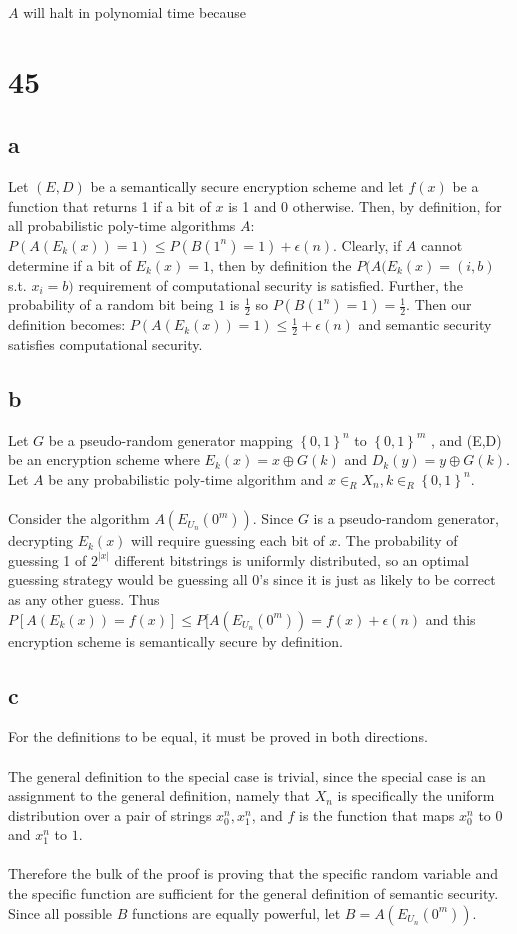 \documentclass[letterpaper,notitlepage,twoside]{article}
\begin{document}
$A$ will halt in polynomial time because \\

\section*{45}
\subsection*{a}
Let $(E, D)$ be a semantically secure encryption scheme and let $f(x)$ be a function that returns 1 if a bit of $x$ is 1 and 0 otherwise.
Then, by definition, for all probabilistic poly-time algorithms $A$: $P(A(E_k(x)) = 1) \leq P(B(1^{n}) = 1) + \epsilon(n)$.
Clearly, if $A$ cannot determine if a bit of $E_k(x) = 1$, then by definition the $P(A(E_k(x) = (i,b)$ s.t. $x_i = b)$ requirement of computational security is satisfied. 
Further, the probability of a random bit being $1$ is $\frac{1}{2}$ so $P(B(1^{n}) = 1) = \frac{1}{2}$. 
Then our definition becomes: $P(A(E_k(x)) = 1) \leq \frac{1}{2} + \epsilon(n)$ and semantic security satisfies computational security.

\subsection*{b}
Let $G$ be a pseudo-random generator mapping $\left\{0, 1\right\}^n$ to $\left\{0, 1\right\}^m$ , and (E,D) be an encryption scheme where $E_k(x) = x \oplus G(k)$ and $D_k(y) = y \oplus G(k)$. Let $A$ be any probabilistic poly-time algorithm and $x \in_R X_n,k \in_R \left\{0,1\right\}^n$.
\\\\
Consider the algorithm $A(E_{U_n}(0^m))$. Since $G$ is a pseudo-random generator, decrypting $E_k(x)$ will require guessing each bit of $x$. The probability of guessing 1 of $2^{|x|}$ different bitstrings is uniformly distributed, so an optimal guessing strategy would be guessing all 0's since it is just as likely to be correct as any other guess. Thus $P[A(E_k(x))=f(x)] \le P[A(E_{U_n}(0^m)) = f(x) + \epsilon(n)$ and this encryption scheme is semantically secure by definition.

\subsection*{c}
For the definitions to be equal, it must be proved in both directions.\\\\
The general definition to the special case is trivial, since the special case is an assignment to the general definition, namely that $X_n$ is specifically the uniform distribution over a pair of strings $x_0^n, x_1^n$, and $f$ is the function that maps $x_0^n$ to $0$ and $x_1^n$ to $1$.\\\\
Therefore the bulk of the proof is proving that the specific random variable and the specific function are sufficient for the general definition of semantic security. Since all possible $B$ functions are equally powerful, let $B = A(E_{U_n}(0^m))$.
\end{document}
